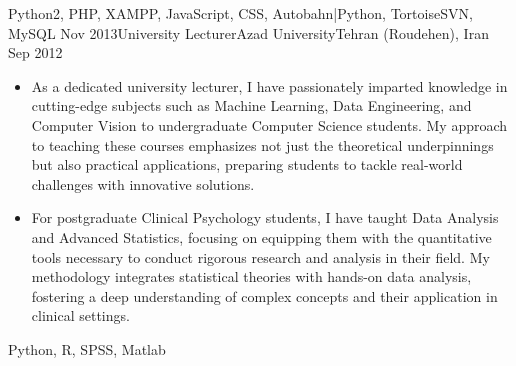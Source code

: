\begin{experiences}
{\begin{itemize}
    \end{itemize}
  }
    {Python2, PHP, XAMPP, JavaScript, CSS, Autobahn|Python, TortoiseSVN, MySQL}
    \emptySeparator
  \experience
  {Nov 2013}{University Lecturer}{Azad University}{Tehran (Roudehen), Iran}
  {Sep 2012} {
    \begin{itemize}
		\item As a dedicated university lecturer, I have passionately imparted knowledge in cutting-edge subjects such as Machine Learning, Data Engineering, and Computer Vision to undergraduate Computer Science students. My approach to teaching these courses emphasizes not just the theoretical underpinnings but also practical applications, preparing students to tackle real-world challenges with innovative solutions.
		
		\item For postgraduate Clinical Psychology students, I have taught Data Analysis and Advanced Statistics, focusing on equipping them with the quantitative tools necessary to conduct rigorous research and analysis in their field. My methodology integrates statistical theories with hands-on data analysis, fostering a deep understanding of complex concepts and their application in clinical settings.

    \end{itemize}
  }
    {Python, R, SPSS, Matlab}
\end{experiences}
